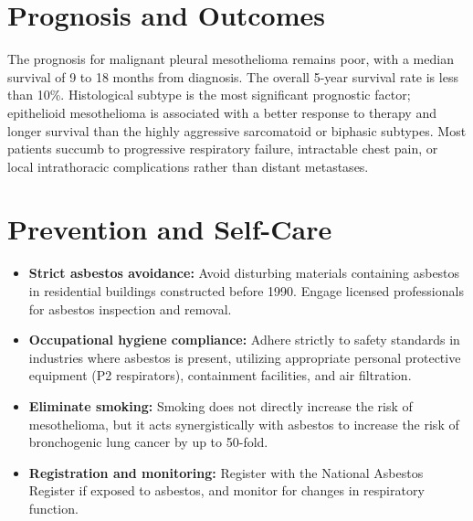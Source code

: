 \section*{Prognosis and Outcomes}
The prognosis for malignant pleural mesothelioma remains poor, with a median survival of 9 to 18 months from diagnosis. The overall 5-year survival rate is less than 10\%. Histological subtype is the most significant prognostic factor; epithelioid mesothelioma is associated with a better response to therapy and longer survival than the highly aggressive sarcomatoid or biphasic subtypes. Most patients succumb to progressive respiratory failure, intractable chest pain, or local intrathoracic complications rather than distant metastases.

\section*{Prevention and Self-Care}
\begin{itemize}
    \item \textbf{Strict asbestos avoidance:} Avoid disturbing materials containing asbestos in residential buildings constructed before 1990. Engage licensed professionals for asbestos inspection and removal.
    \item \textbf{Occupational hygiene compliance:} Adhere strictly to safety standards in industries where asbestos is present, utilizing appropriate personal protective equipment (P2 respirators), containment facilities, and air filtration.
    \item \textbf{Eliminate smoking:} Smoking does not directly increase the risk of mesothelioma, but it acts synergistically with asbestos to increase the risk of bronchogenic lung cancer by up to 50-fold.
    \item \textbf{Registration and monitoring:} Register with the National Asbestos Register if exposed to asbestos, and monitor for changes in respiratory function.
\end{itemize}

